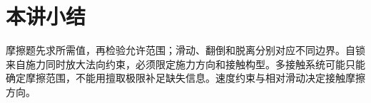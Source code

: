\section{本讲小结}
摩擦题先求所需值，再检验允许范围；滑动、翻倒和脱离分别对应不同边界。自锁来自施力同时放大法向约束，必须限定施力方向和接触构型。多接触系统可能只能确定摩擦范围，不能用擅取极限补足缺失信息。速度约束与相对滑动决定接触摩擦方向。
